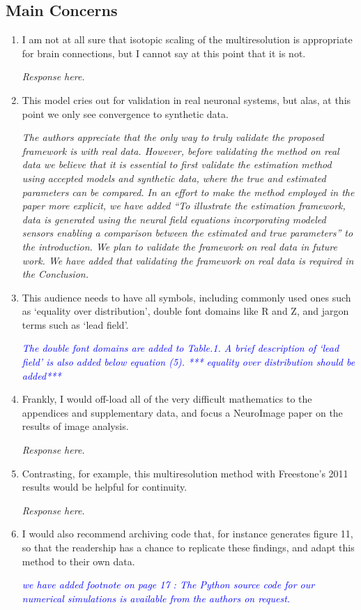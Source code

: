 \documentclass{article}
\newcommand{\parham}[1]{\textcolor{blue}{#1}}
\begin{document}
    \subsection{Main Concerns}
		\begin{enumerate} 
			\item I am not at all sure that isotopic scaling of the multiresolution is appropriate for brain connections, but I cannot say at this point that it is not.
			
			\emph{Response here.}
			 
			\item This model cries out for validation in real neuronal systems, but alas, at this point we only see convergence to synthetic data.   
			
			\emph{The authors appreciate that the only way to truly validate the proposed framework is with real data. However, before validating the method on real data we believe that it is essential to first validate the estimation method using accepted models and synthetic data, where the true and estimated parameters can be compared. In an effort to make the method employed in the paper more explicit, we have added ``To illustrate the estimation framework, data is generated using the neural field equations incorporating modeled sensors enabling a comparison between the estimated and true parameters'' to the introduction. We plan to validate the framework on real data in future work. We have added that validating the framework on real data is required in the Conclusion.}  
			
			\item This audience needs to have all symbols, including commonly used ones such as `equality over distribution', double font domains like R and Z, and jargon terms such as `lead field'.
			
			\emph{\parham{The double font domains are added to Table.1. A brief description of `lead field' is also added below equation (5). *** equality over distribution should be added***}}  
			
			\item Frankly, I would off-load all of the very difficult mathematics to the appendices and supplementary data, and focus a NeuroImage paper on the results of image analysis. 
			
			\emph{Response here.}
			
			\item Contrasting, for example, this multiresolution method with Freestone's 2011 results would be helpful for continuity.
			
			\emph{Response here.}
			
			\item I would also recommend archiving code that, for instance generates figure 11, so that the readership has a chance to replicate these findings, and adapt this method to their own data.
			
 			\emph{\parham{we have added footnote on page 17 : The Python source code for our numerical simulations is available from the authors on request.}}
 		
			                                       
			\end{enumerate}  
\end{document}
